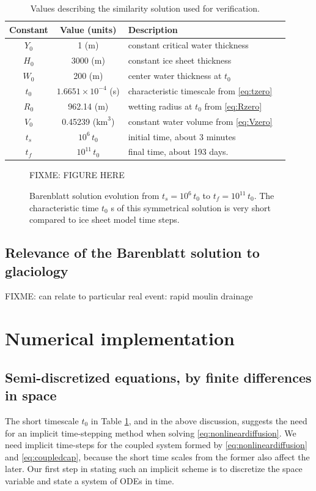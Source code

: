 \documentclass[11pt]{amsart}
\begin{document}
\begin{table}[ht]
  \centering
  \caption{Values describing the similarity solution used for verification.}
  \begin{tabular}{ccll}
    \textbf{Constant} & \textbf{Value (units)} & \textbf{Description} \\
    \hline
    $Y_0$ & 1 (m) & constant critical water thickness \\
    $H_0$ & 3000 (m) & constant ice sheet thickness \\
    $W_0$ & 200 (m) & center water thickness at $t_0$ \\
    $t_0$ & $1.6651 \times 10^{-4}$ (s) & characteristic timescale from \eqref{eq:tzero} \\
    $R_0$ & 962.14 (m) & wetting radius at $t_0$ from \eqref{eq:Rzero} \\
    $V_0$ & 0.45239 ($\text{km}^3$) & constant water volume from \eqref{eq:Vzero} \\
    $t_s$ & $10^6\, t_0$ & initial time, about 3 minutes \\
    $t_f$ & $10^{11}\, t_0$ & final time, about 193 days.
   \\\hline
  \end{tabular}
 \label{tab:barenconstants}
\end{table}


\begin{figure}[ht]
\centering
\bigskip
FIXME: FIGURE HERE
\bigskip
\caption{Barenblatt solution evolution from $t_s = 10^6\, t_0$ to $t_f = 10^{11}\, t_0$.  The characteristic time $t_0$ s of this symmetrical solution is very short compared to ice sheet model time steps.}
\label{fig:baren}
\end{figure}


\subsection*{Relevance of the Barenblatt solution to glaciology}  FIXME: can relate to particular real event: rapid moulin drainage



\section{Numerical implementation} \label{sec:implementation}

\subsection*{Semi-discretized equations, by finite differences in space}  The short timescale $t_0$ in Table \ref{tab:barenconstants}, and in the above discussion, suggests the need for an implicit time-stepping method when solving \eqref{eq:nonlineardiffusion}.  We need implicit time-steps for the coupled system formed by \eqref{eq:nonlineardiffusion} and \eqref{eq:coupledcap}, because the short time scales from the former also affect the later.  Our first step in stating such an implicit scheme is to discretize the space variable and state a system of ODEs in time.
\end{document}
